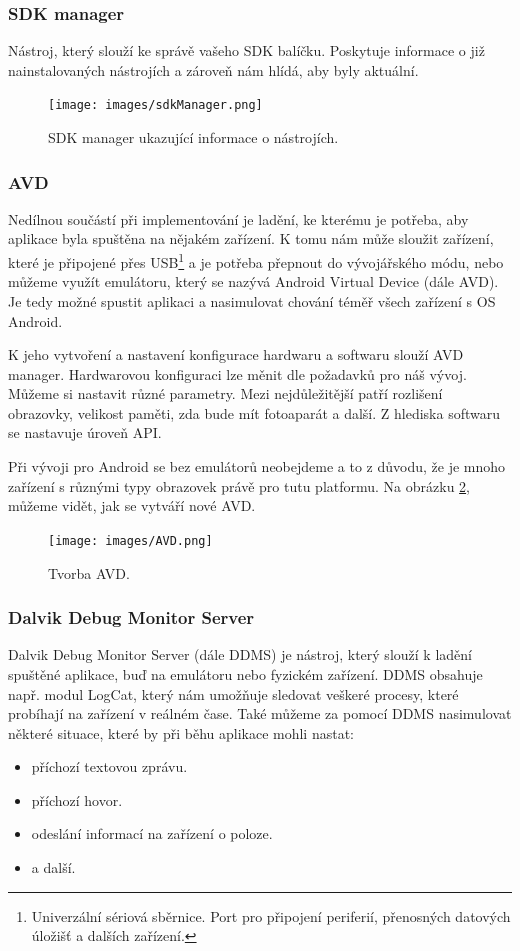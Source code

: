 \documentclass[12pt]{article}
\begin{document}
\subsubsection{SDK manager}
Nástroj, který slouží ke správě vašeho SDK balíčku. Poskytuje informace o již nainstalovaných nástrojích a zároveň nám hlídá, aby byly aktuální.
\begin{figure}[ht]
\centerline{\texttt{[image: images/sdkManager.png]}}
\caption{SDK manager ukazující informace o nástrojích.} \label{manager}
\end{figure}
\subsubsection{AVD}
Nedílnou součástí při implementování je ladění, ke kterému je potřeba, aby aplikace byla spuštěna na nějakém zařízení. K tomu nám může sloužit zařízení, které je připojené přes USB\footnote[5]{Univerzální sériová sběrnice. Port pro připojení periferií, přenosných datových úložišť a dalších zařízení.} a je potřeba přepnout do vývojářského módu, nebo můžeme využít emulátoru, který se nazývá Android Virtual Device (dále AVD). Je tedy možné spustit aplikaci a nasimulovat chování téměř všech zařízení s OS Android.

K jeho vytvoření a nastavení konfigurace hardwaru a softwaru slouží AVD manager. Hardwarovou konfiguraci lze měnit dle požadavků pro náš vývoj. Můžeme si nastavit různé parametry. Mezi nejdůležitější patří rozlišení obrazovky, velikost paměti, zda bude mít fotoaparát a další. Z hlediska softwaru se nastavuje úroveň API.

Při vývoji pro Android se bez emulátorů neobejdeme a to z důvodu, že je mnoho zařízení s různými typy obrazovek právě pro tutu platformu. Na obrázku \ref{avd}, můžeme vidět, jak se vytváří nové AVD.
\newpage
\begin{figure}[ht]
\centerline{\texttt{[image: images/AVD.png]}}
\caption{Tvorba AVD.} \label{avd}
\end{figure}

\subsubsection{Dalvik Debug Monitor Server}
Dalvik Debug Monitor Server (dále DDMS) je nástroj, který slouží k ladění spuštěné aplikace, buď na emulátoru nebo fyzickém zařízení. DDMS obsahuje např. modul LogCat, který nám umožňuje sledovat veškeré procesy, které probíhají na zařízení v reálném čase. Také můžeme za pomocí DDMS nasimulovat některé situace, které by při běhu aplikace mohli nastat:
\begin{itemize}
\item příchozí textovou zprávu.
\item příchozí hovor.
\item odeslání informací na zařízení o poloze.
\item a další.
\end{itemize}
\end{document}
